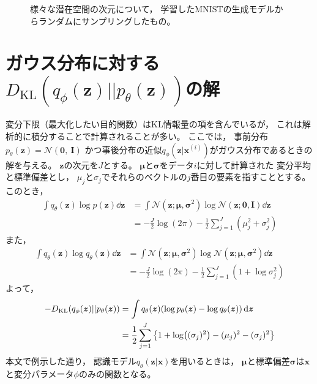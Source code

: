 \documentclass[dvipdfmx, fleqn, draft]{jsarticle}
\begin{document}
\begin{figure}[H]
\begin{minipage}{0.2\linewidth}
        \label{fig:latent_space_20D}
    \end{minipage}
    \caption{
        様々な潜在空間の次元について，
        学習したMNISTの生成モデルからランダムにサンプリングしたもの。
        }
    \label{fig:latent_spaces}
\end{figure}



\section{ガウス分布に対する\(D_\mathrm{KL}(q_{\phi}(\bm{z}) || p_{\theta} (\bm{z}))\)の解}

変分下限（最大化したい目的関数）はKL情報量の項を含んでいるが，
これは解析的に積分することで計算されることが多い。
ここでは，
事前分布\(p_{\theta} (\bm{z}) = \mathcal{N} (\bm{0},\ \bm{I})\)
かつ事後分布の近似\(q_{\phi} (\bm{z} | \bm{x}^{(i)})\)がガウス分布であるときの解を与える。
\(\bm{z}\)の次元を\(J\)とする。
\(\bm{\mu}\)と\(\bm{\sigma}\)をデータ\(i\)に対して計算された
変分平均と標準偏差とし，
\(\mu_j\)と\(\sigma_j\)でそれらのベクトルの\(j\)番目の要素を指すこととする。
このとき，
\begin{align*}
    \int q_{\theta} (\bm{z}) \log{p(\bm{z})} \dd{\bm{z}}
        & = \int \mathcal{N} (\bm{z}; \bm{\mu}, \bm{\sigma}^2) \log{\mathcal{N}(\bm{z}; \bm{0}, \bm{I})} \dd{\bm{z}} \\
        & = -\frac{J}{2} \log(2\pi) - \frac{1}{2} \sum_{j=1}^{J} (\mu_j^2 + \sigma_j^2)
\end{align*}
また，
\begin{align*}
    \int q_{\theta} (\bm{z}) \log{q_{\theta} (\bm{z})} \dd{\bm{z}}
        & = \int \mathcal{N} (\bm{z}; \bm{\mu}, \bm{\sigma}^2) \log{\mathcal{N}(\bm{z}; \bm{\mu}, \bm{\sigma}^2)} \dd{\bm{z}} \\
        & = -\frac{J}{2} \log(2\pi) - \frac{1}{2} \sum_{j=1}^{J} (1 + \log{\sigma_j^2})
\end{align*}
よって，
\begin{align*}
    -D_\mathrm{KL}(q_{\phi}(\bm{z}) || p_{\theta} (\bm{z}))
        & = \int q_{\theta} (\bm{z}) \qty(\log{p_{\theta} (\bm{z}) - \log{q_{\theta} (\bm{z})}}) \dd{\bm{z}} \\
        & = \frac{1}{2} \sum_{j=1}^{J} \qty{1 + \log((\sigma_j)^2) - (\mu_j)^2 - (\sigma_j)^2}
\end{align*}
本文で例示した通り，
認識モデル\(q_{\theta} (\bm{z} | \bm{x})\)を用いるときは，
\(\bm{\mu}\)と標準偏差\(\bm{\sigma}\)は\(\bm{x}\)と変分パラメータ\(\phi\)のみの関数となる。
\end{document}
